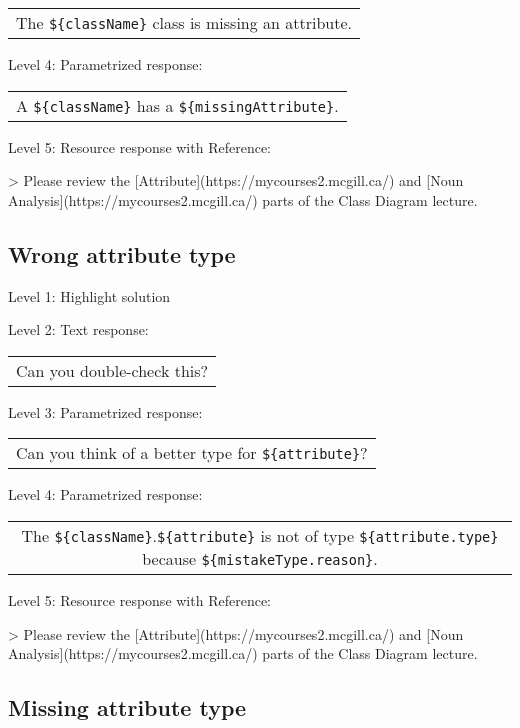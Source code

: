 \begin{tabular}{|c}
The \verb|${className}| class is missing an attribute.
\end{tabular} \medskip

\noindent Level 4: Parametrized response: \medskip

\begin{tabular}{|c}
A \verb|${className}| has a \verb|${missingAttribute}|.
\end{tabular} \medskip

\noindent Level 5: Resource response with Reference:

> Please review the [Attribute](https://mycourses2.mcgill.ca/) and [Noun Analysis](https://mycourses2.mcgill.ca/) parts of the Class Diagram lecture.


\subsection{Wrong attribute type}

\noindent Level 1: Highlight solution \medskip

\noindent Level 2: Text response: \medskip

\begin{tabular}{|c}
Can you double-check this?
\end{tabular} \medskip

\noindent Level 3: Parametrized response: \medskip

\begin{tabular}{|c}
Can you think of a better type for \verb|${attribute}|?
\end{tabular} \medskip

\noindent Level 4: Parametrized response: \medskip

\begin{tabular}{|c}
The \verb|${className}|.\verb|${attribute}| is not of type \verb|${attribute.type}| because \verb|${mistakeType.reason}|.
\end{tabular} \medskip

\noindent Level 5: Resource response with Reference:

> Please review the [Attribute](https://mycourses2.mcgill.ca/) and [Noun Analysis](https://mycourses2.mcgill.ca/) parts of the Class Diagram lecture.


\subsection{Missing attribute type}

